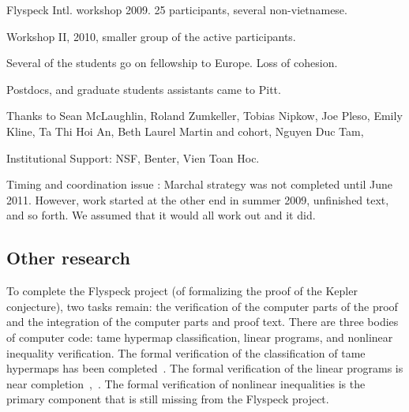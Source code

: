 \documentclass{llncs}
\begin{document}
Flyspeck Intl. workshop 2009. 25 participants, several non-vietnamese.

Workshop II, 2010, smaller group of the active participants.

Several of the students go on fellowship to Europe. Loss of cohesion.

Postdocs, and graduate students assistants came to Pitt.



Thanks to Sean McLaughlin, Roland Zumkeller, Tobias Nipkow, Joe Pleso,
Emily Kline, Ta Thi Hoi An, Beth Laurel Martin and cohort, Nguyen Duc Tam,

Institutional Support: NSF, Benter, Vien Toan Hoc.

Timing and coordination 
issue : Marchal strategy was not completed until June 2011. However,
work started at the other end in summer 2009, unfinished text, and so forth.
We assumed that it would all work out and it did.


\subsection{Other research}

To complete the Flyspeck project (of formalizing the proof of the
Kepler conjecture), two tasks remain: the verification of the computer
parts of the proof and the integration of the computer parts and proof
text.  There are three bodies of computer code: tame hypermap
classification, linear programs, and nonlinear inequality
verification.  The formal verification of the classification of tame
hypermaps has been completed~\cite{XX}.  The formal verification of
the linear programs is near completion~\cite{XX},~\cite{XX}.  The
formal verification of nonlinear inequalities is the primary component
that is still missing from the Flyspeck project.

\bigskip
\noindent
\svninfo
\end{document}
